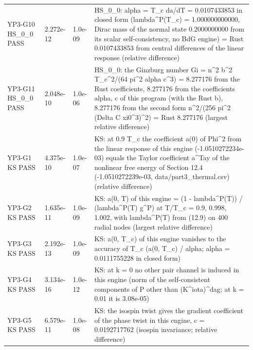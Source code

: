 \documentclass[aps,prd,onecolumn,superscriptaddress,nofootinbib,floatfix,longbibliography]{revtex4-2}
\begin{document}
\begin{longtable}{p{}p{}p{}p{}}
YP3-G10 HS\_0\_0 \newline PASS & 2.272e-12 & 1.0e-09 & HS\_0\_0: alpha = T\_c da/dT = 0.0107433853 in closed form (lambda\textasciicircum{}P(T\_c) = 1.000000000000, Dirac mass of the normal state 0.2000000000 from its scalar self-consistency, no BdG engine) = Rust 0.0107433853 from central differences of the linear response (relative difference) \\
YP3-G11 HS\_0\_0 \newline PASS & 2.048e-10 & 1.0e-06 & HS\_0\_0: the Ginzburg number Gi = n\textasciicircum{}2 b\textasciicircum{}2 T\_c\textasciicircum{}2/(64 pi\textasciicircum{}2 alpha c\textasciicircum{}3) = 8.277176 from the Rust coefficients, 8.277176 from the coefficients alpha, c of this program (with the Rust b), 8.277176 from the second form n\textasciicircum{}2/(256 pi\textasciicircum{}2 (Delta C xi0\textasciicircum{}3)\textasciicircum{}2) = Rust 8.277176 (largest relative difference) \\
YP3-G1 KS \newline PASS & 4.375e-10 & 1.0e-07 & KS: at 0.9 T\_c the coefficient a(0) of \textbar{}Phi\textbar{}\textasciicircum{}2 from the linear response of this engine (-1.0510272234e-03) equals the Taylor coefficient a\textasciicircum{}Tay of the nonlinear free energy of Section 12.4 (-1.0510272239e-03, data/part3\_thermal.csv) (relative difference) \\
YP3-G2 KS \newline PASS & 1.635e-11 & 1.0e-09 & KS: a(0, T) of this engine = (1 - lambda\textasciicircum{}P(T)) / (lambda\textasciicircum{}P(T) g\textasciicircum{}P) at T/T\_c = 0.9, 0.998, 1.002, with lambda\textasciicircum{}P(T) from (12.9) on 400 radial nodes (largest relative difference) \\
YP3-G3 KS \newline PASS & 2.192e-13 & 1.0e-09 & KS: a(0, T\_c) of this engine vanishes to the accuracy of T\_c (\textbar{}a(0, T\_c)\textbar{} / alpha; alpha = 0.0111755228 in closed form) \\
YP3-G4 KS \newline PASS & 3.134e-16 & 1.0e-12 & KS: at k = 0 no other pair channel is induced in this engine (norm of the self-consistent components of P other than (K\textasciicircum{}iota)\textasciicircum{}dag; at k = 0.01 it is 3.08e-05) \\
YP3-G5 KS \newline PASS & 6.579e-11 & 1.0e-08 & KS: the isospin twist gives the gradient coefficient of the phase twist in this engine, c = 0.0192717762 (isospin invariance; relative difference) \\

\end{longtable}
\end{document}
